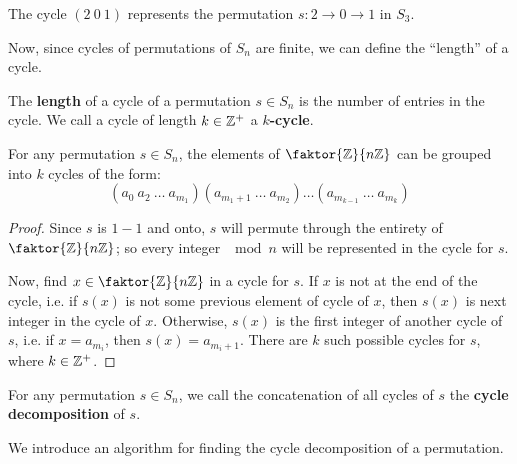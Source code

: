 \begin{example}
  The cycle $(2 \ 0 \ 1)$ represents the permutation $s:2 \rightarrow 0
  \rightarrow 1$ in $S_3$.
\end{example}

Now, since cycles of permutations of $S_n$ are finite, we can define the
``length'' of a cycle.

\begin{definition}
  The \textbf{length} of a cycle of a permutation $s \in S_n$ is the number of
  entries in the cycle. We call a cycle of length  $k \in \mathbb{Z}^+$ a
  \textbf{$k$-cycle}.
\end{definition}

\begin{lemma}\label{lemma_1.3.3}
  For any permutation $s \in S_n$, the elements of  $\faktor{\Z}{n\Z}$ can be
  grouped into $k$ cycles of the form:
  \begin{equation}
    (a_0 \ a_2 \ \dots \ a_{m_1})(a_{m_1+1} \ \dots \ a_{m_2}) \dots
    (a_{m_{k-1}} \ \dots \ a_m_k)
  \end{equation}
\end{lemma}
\begin{proof}
  Since $s$ is  $1-1$ and onto,  $s$ will permute through the entirety of
  $\faktor{\Z}{n\Z}$; so every integer $\mod{n}$ will be represented in the
  cycle for $s$.

  Now, find  $x \in \faktor{\Z}{n\Z}$ in a cycle for $s$. If  $x$ is not at
  the end of the cycle, i.e. if  $s(x)$ is not some previous element of cycle
  of $x$, then $s(x)$ is next integer in the cycle of $x$. Otherwise,  $s(x)$
  is the first integer of another cycle of $s$, i.e. if  $x=a_{m_i}$, then
  $s(x)=a_{m_i+1}$. There are $k$ such possible cycles for  $s$, where  $k \in
  \mathbb{Z}^+$.
\end{proof}

\begin{definition}
  For any permutation $s \in S_n$, we  call the concatenation of all cycles
  of $s$ the  \textbf{cycle decomposition} of $s$.
\end{definition}

We introduce an algorithm for finding the cycle decomposition of a
permutation.

